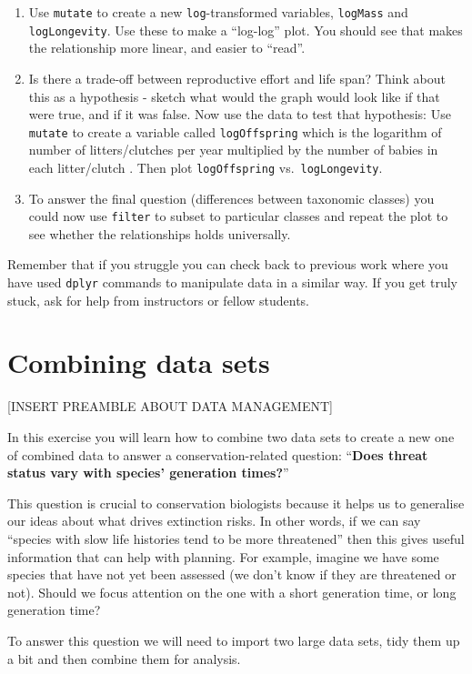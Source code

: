 \documentclass[
  a4paperpaper,
]{book}
\begin{document}
\begin{enumerate}
\item
  Use \texttt{mutate} to create a new \texttt{log}-transformed variables, \texttt{logMass} and \texttt{logLongevity}. Use these to make a ``log-log'' plot. You should see that makes the relationship more linear, and easier to ``read''.
\item
  Is there a trade-off between reproductive effort and life span? Think about this as a hypothesis - sketch what would the graph would look like if that were true, and if it was false. Now use the data to test that hypothesis: Use \texttt{mutate} to create a variable called \texttt{logOffspring} which is the logarithm of number of litters/clutches per year multiplied by the number of babies in each litter/clutch . Then plot \texttt{logOffspring} vs.~\texttt{logLongevity}.
\item
  To answer the final question (differences between taxonomic classes) you could now use \texttt{filter} to subset to particular classes and repeat the plot to see whether the relationships holds universally.
\end{enumerate}

Remember that if you struggle you can check back to previous work where you have used \texttt{dplyr} commands to manipulate data in a similar way. If you get truly stuck, ask for help from instructors or fellow students.

\hypertarget{combining-data-sets}{%
\chapter{Combining data sets}\label{combining-data-sets}}

{[}INSERT PREAMBLE ABOUT DATA MANAGEMENT{]}

In this exercise you will learn how to combine two data sets to create a new one of combined data to answer a conservation-related question: ``\textbf{Does threat status vary with species' generation times?}''

This question is crucial to conservation biologists because it helps us to generalise our ideas about what drives extinction risks. In other words, if we can say ``species with slow life histories tend to be more threatened'' then this gives useful information that can help with planning. For example, imagine we have some species that have not yet been assessed (we don't know if they are threatened or not). Should we focus attention on the one with a short generation time, or long generation time?

To answer this question we will need to import two large data sets, tidy them up a bit and then combine them for analysis.
\end{document}
